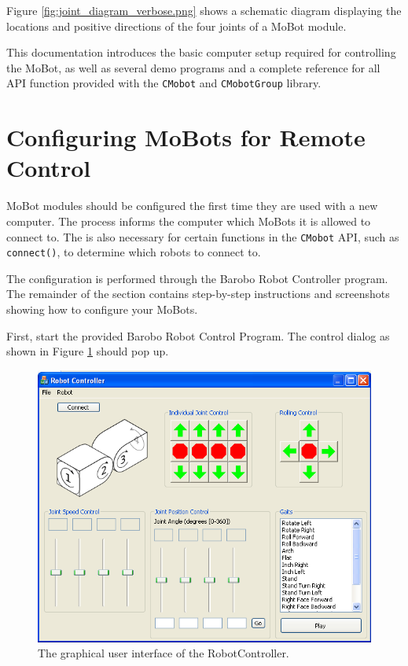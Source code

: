 \documentclass{article}
\begin{document}
Figure \ref{fig:joint_diagram_verbose.png} shows a schematic diagram displaying the
locations and positive directions of the four joints of a MoBot module. 

This documentation introduces the basic computer setup required for controlling 
the MoBot, as well as several demo programs and a complete reference for all
API function provided with the \texttt{CMobot} and \texttt{CMobotGroup} library.

\section{\label{sec:pairing}Configuring MoBots for Remote Control}
MoBot modules should be configured the first time they are used with 
a new computer. The process informs the computer which MoBots it
is allowed to connect to. The is also necessary for certain 
functions in the \texttt{CMobot} API, such as \texttt{connect()},
to determine which robots to connect to.

The configuration is performed through the Barobo Robot Controller
program. The remainder of the section contains step-by-step instructions
and screenshots showing how to configure your MoBots.

First, start the provided Barobo Robot Control Program. The 
control dialog as shown in Figure \ref{fig:shot1.png} should pop up.

\begin{figure}[H]
\begin{center}
\includegraphics[width=4.5in]{images/shot1.png}
\end{center}
\caption{\label{fig:shot1.png} The graphical user interface of the RobotController.}
\end{figure}
\end{document}

